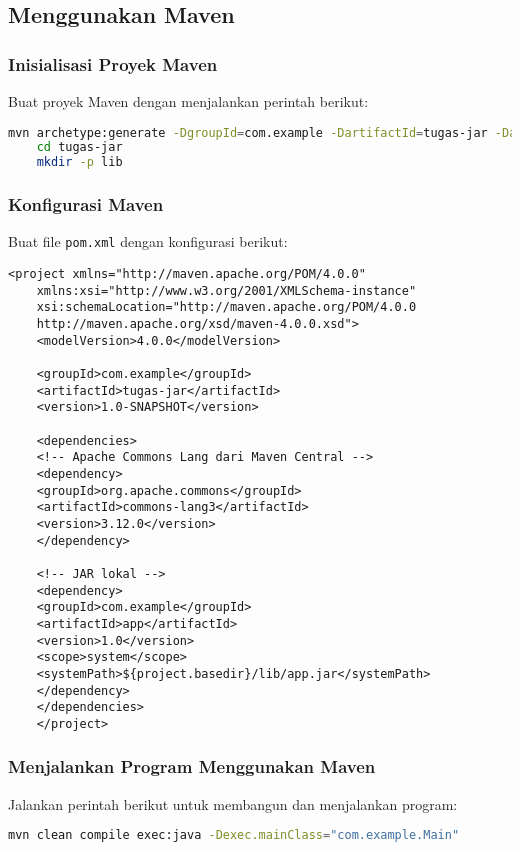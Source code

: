 \subsection{Menggunakan Maven}
\subsubsection{Inisialisasi Proyek Maven}
Buat proyek Maven dengan menjalankan perintah berikut:

\begin{lstlisting}[language=bash]
	mvn archetype:generate -DgroupId=com.example -DartifactId=tugas-jar -DarchetypeArtifactId=maven-archetype-quickstart -DinteractiveMode=false
	cd tugas-jar
	mkdir -p lib
\end{lstlisting}

\subsubsection{Konfigurasi Maven}
Buat file \texttt{pom.xml} dengan konfigurasi berikut:

\begin{lstlisting}[style=XmlStyle]
	<project xmlns="http://maven.apache.org/POM/4.0.0"
	xmlns:xsi="http://www.w3.org/2001/XMLSchema-instance"
	xsi:schemaLocation="http://maven.apache.org/POM/4.0.0
	http://maven.apache.org/xsd/maven-4.0.0.xsd">
	<modelVersion>4.0.0</modelVersion>
	
	<groupId>com.example</groupId>
	<artifactId>tugas-jar</artifactId>
	<version>1.0-SNAPSHOT</version>
	
	<dependencies>
	<!-- Apache Commons Lang dari Maven Central -->
	<dependency>
	<groupId>org.apache.commons</groupId>
	<artifactId>commons-lang3</artifactId>
	<version>3.12.0</version>
	</dependency>
	
	<!-- JAR lokal -->
	<dependency>
	<groupId>com.example</groupId>
	<artifactId>app</artifactId>
	<version>1.0</version>
	<scope>system</scope>
	<systemPath>${project.basedir}/lib/app.jar</systemPath>
	</dependency>
	</dependencies>
	</project>
\end{lstlisting}

\subsubsection{Menjalankan Program Menggunakan Maven}
Jalankan perintah berikut untuk membangun dan menjalankan program:

\begin{lstlisting}[language=bash]
	mvn clean compile exec:java -Dexec.mainClass="com.example.Main"
\end{lstlisting}

